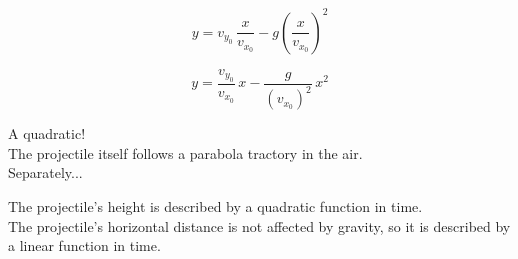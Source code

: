 \documentclass{ximera}
\begin{document}
\[  y = v_{y_0} \, \frac{x}{v_{x_0}} - g \left(\frac{x}{v_{x_0}}\right)^2  \]



\[  y = \frac{v_{y_0}}{v_{x_0}} \, x  - \frac{g}{(v_{x_0})^2} \, x^2 \]



A quadratic! \\

The projectile itself follows a parabola tractory in the air. \\


Separately...


The projectile's height is described by a quadratic function in time. \\


The projectile's horizontal distance is not affected by gravity, so it is described by a linear function in time. \\
\end{document}
